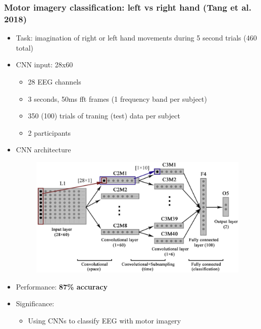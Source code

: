 \documentclass{beamer}
\begin{document}
\begin{frame}
	\frametitle{Motor imagery classification: left vs right hand (Tang et al. 2018)}
	
	\begin{itemize}

		\item Task: imagination of right or left hand movements during 5 second trials (460 total)

		\item CNN input: 28x60 
		\begin{itemize}
			\item 28 EEG channels
			\item 3 seconds, 50ms fft frames (1 frequency band per subject)
			\item 350 (100) trials of traning (test) data per subject 
			\item 2 participants
		\end{itemize}
		
		\item CNN architecture
		\begin{figure}
			\centering
			\includegraphics[scale=0.85]{fig7.jpg}
		\end{figure}
	
		\item Performance: \textbf{87\% accuracy}

		\item Significance: 
		\begin{itemize}
			\item Using CNNs to classify EEG with motor imagery
		\end{itemize}	

	\end{itemize}

\end{frame}
\end{document}
